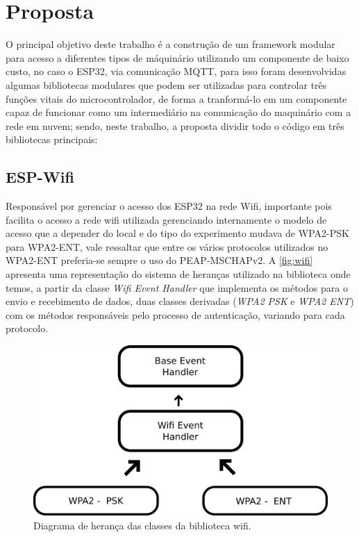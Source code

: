 \chapter[Proposta]{Proposta}

O principal objetivo deste trabalho é a construção de um framework modular para acesso a diferentes tipos de máquinário
utilizando um componente de baixo custo, no caso o ESP32, via comunicação \ac{MQTT}, para isso foram desenvolvidas algumas 
bibliotecas modulares que podem ser utilizadas para controlar três funções vitais do microcontrolador, de forma a 
tranformá-lo em um componente capaz de funcionar como um intermediário na comunicação do maquinário com a rede em nuvem; 
sendo, neste trabalho, a proposta dividir todo o código em três bibliotecas principais:

\section{ESP-Wifi}

Responsável por gerenciar o acesso dos ESP32 na rede Wifi, importante pois facilita o acesso a rede wifi utilizada 
gerenciando internamente o modelo de acesso que a depender do local e do tipo do experimento mudava de \ac{WPA2-PSK}
para \ac{WPA2-ENT}, vale ressaltar que entre os vários protocolos utilizados no \ac{WPA2-ENT} preferia-se sempre o uso do 
\ac{PEAP-MSCHAPv2}. A \autoref{fig:wifi} apresenta uma representação do sistema de heranças utilizado na biblioteca onde
temos, a partir da classe \textit{Wifi Event Handler} que implementa os métodos para o envio e recebimento de dados,
duas classes derivadas (\textit{WPA2 PSK} e \textit{WPA2 ENT}) com os métodos responsáveis pelo processo de autenticação,
variando para cada protocolo.

\begin{figure}[htb]
    \begin{center}
	    \includegraphics[scale=0.5]{figs/wifi-dia.png}
	\end{center}
	\caption{\label{fig:wifi} Diagrama de herança das classes da biblioteca wifi.} 
\end{figure}

